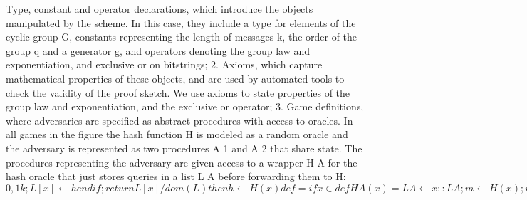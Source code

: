 \documentclass[runningheads,a4paper]{llncs}
\begin{document}
Type, constant and operator declarations, which introduce the objects manipulated by the scheme.
In this case, they include a type for elements of the cyclic group G, constants representing the
length of messages k, the order of the group q and a generator g, and operators denoting the group
law and exponentiation, and exclusive or on bitstrings;
2. Axioms, which capture mathematical properties of these objects, and are used by automated tools
to check the validity of the proof sketch. We use axioms to state properties of the group law and
exponentiation, and the exclusive or operator;
3. Game definitions, where adversaries are specified as abstract procedures with access to oracles.
In all games in the figure the hash function H is modeled as a random oracle and the adversary
is represented as two procedures A 1 and A 2 that share state. The procedures representing the
adversary are given access to a wrapper H A for the hash oracle that just stores queries in a list
L A before forwarding them to H:
$ {0, 1} k ; L[x] ← h end if; return L[x]
/ dom(L) then h ←
H(x) def
= if x ∈
def
H A (x) = L A ← x :: L A ; m ← H(x); return m
4. Judgments in pRHL. The general form of judgments is |= G 1 ∼ G 2 : Ψ ⇒ Φ, where G 1 and G 2
are games, and the pre-condition Ψ and the post-condition Φ are relations on program memories
(memories map program variables to values). Pre- and post-conditions are first-order formulae
built from relational expressions, in which language expressions are tagged with h1i or h2i to
denote their interpretation in the first or second game. We often consider equivalence of memories
on a set of variables X; we use = X as a shorthand for the formula ∀x ∈ X. xh1i = xh2i;
5. Claims about probability, built from probability quantities (the probability of an event in a game),
arithmetic operators, and mathematical relations (e.g. =, <, ≤). The final statement that expresses
the overall security guarantee brought by the proof sketch is usually a claim that upper bounds
the probability of adversary success in an initial attack game in terms of the probabilities of one
or more adversaries breaking security assumptions. $
\end{document}
